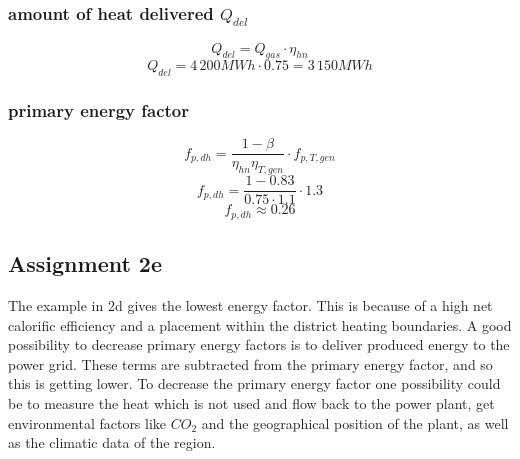 \documentclass{article}
\begin{document}
		\subsubsection*{amount of heat delivered $Q_{del}$}
			$$Q_{del}=Q_{gas}\cdot \eta_{hn}$$
			$$Q_{del}=4\,200MWh\cdot 0.75 = 3\,150MWh$$
		\subsubsection*{primary energy factor}
			$$f_{p,dh}=\frac{1-\beta}{\eta_{hn}\eta_{T,gen}}\cdot f_{p,T,gen}$$
			$$f_{p,dh}=\frac{1-0.83}{0.75\cdot 1.1}\cdot 1.3$$
			$$f_{p,dh}\approx 0.26$$

	\newpage
	\subsection*{Assignment 2e}
The example in 2d gives the lowest energy factor. This is because of a high net calorific efficiency and a placement within the district heating boundaries. A good possibility to decrease primary energy factors is to deliver produced energy to the power grid. These terms are subtracted from the primary energy factor, and so this is getting lower. To decrease the primary energy factor one possibility could be to measure the heat which is not used and flow back to the power plant, get environmental factors like $CO_2$ and the geographical position of the plant, as well as the climatic data of the region.
\end{document}
